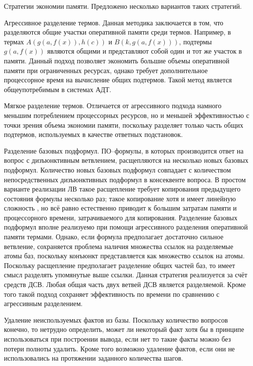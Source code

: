 \documentclass[a4paper]{report}
\begin{document}
Стратегии экономии памяти. Предложено несколько вариантов таких стратегий.

Агрессивное разделение термов. Данная методика заключается в том, что разделяются общие участки оперативной памяти среди термов. Например, в термах $A(g(a,f(x)),h(c))$ и $B(k,g(a,f(x)))$, подтермы $g(a,f(x))$ являются общими и представляют собой один и тот же участок в памяти. Данный подход позволяет экономить большие объемы оперативной памяти при ограниченных ресурсах, однако требует дополнительное процессорное время на вычисление общих подтермов. Такой метод является общеупотребимым в системах АДТ.

Мягкое разделение термов. Отличается от агрессивного подхода намного меньшим потреблением процессорных ресурсов, но и меньшей эффективностью с точки зрения объема экономии памяти, поскольку разделяет только часть общих подтермов, используемых в качестве ответных подстановок.

Разделение базовых подформул. ПО--формулы, в которых производится ответ на вопрос с дизъюнктивным ветвлением, расщепляются на несколько новых базовых подформул. Количество новых базовых подформул совпадает с количеством непосредственных дизъюнктивных подформул в консеквенте вопроса. В простом варианте реализации ЛВ \cite{dissChe} такое расщепление требует копирования предыдущего состояния формулы несколько раз; такое копирование хотя и имеет линейную сложность \cite{Che2}, но всё равно естественно приводит к большим затратам памяти и процессорного времени, затрачиваемого для копирования. Разделение базовых подформул вполне реализуемо при помощи агрессивного разделения оперативной памяти термами. Однако, если формула предполагает достаточно сильное ветвление, сохраняется проблема наличия множества ссылок на разделяемые атомы баз, поскольку конъюнкт представляется как множество ссылок на атомы. Поскольку расщепление предполагает разделение общих частей баз, то имеет смысл разделять упомянутые выше ссылки. Данная стратегия реализуется за счёт средств ДСВ. Любая общая часть двух ветвей ДСВ является разделяемой. Кроме того такой подход сохраняет эффективность по времени по сравнению с агрессивным разделением.

Удаление неиспользуемых фактов из базы. Поскольку количество вопросов конечно, то нетрудно определить, может ли некоторый факт хотя бы в принципе использоваться при построении вывода, если нет то такие факты можно без потери полноты удалить. Кроме того возможно удаление фактов, если они не использовались на протяжении заданного количества шагов.
\end{document}
